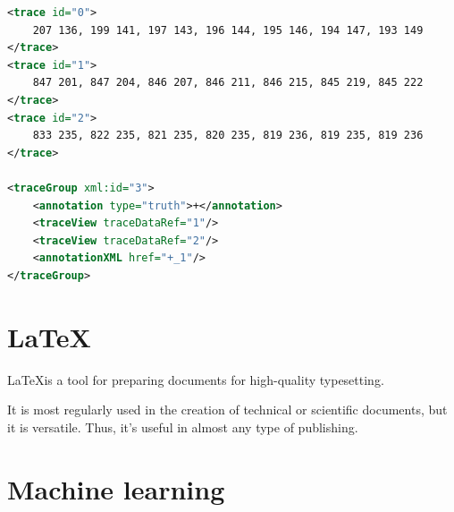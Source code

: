 \begin{minipage}{\linewidth}
\begin{lstlisting}[language=XML, %
label={lst:InkML_ex},
caption={\textbf{\gls{InkML}} example of three traces, each with an file-unique id. In addition to traces, we have listed a tracegroup, which specifies what and where the traces belong to. Truths are used when providing labels to use in supervised learning, which is explained later in this chapter.}]
<trace id="0">
    207 136, 199 141, 197 143, 196 144, 195 146, 194 147, 193 149
</trace>
<trace id="1">
    847 201, 847 204, 846 207, 846 211, 846 215, 845 219, 845 222
</trace>
<trace id="2">
    833 235, 822 235, 821 235, 820 235, 819 236, 819 235, 819 236
</trace>

<traceGroup xml:id="3">
	<annotation type="truth">+</annotation>
	<traceView traceDataRef="1"/>
	<traceView traceDataRef="2"/>
	<annotationXML href="+_1"/>
</traceGroup>
\end{lstlisting}
\end{minipage}


\section{\LaTeX}
\label{latex}

\LaTeX is a tool for preparing documents for high-quality typesetting. 

It is most regularly used in the creation of technical or scientific documents, but it is versatile. Thus, it's useful in almost any type of publishing.\parencite{_introduction_2018} \\ %


\section{Machine learning}
\label{machine_learning}
% 

